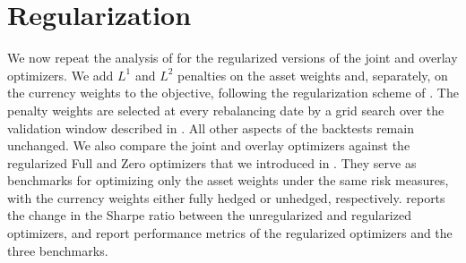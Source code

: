 \section{Regularization} \label{sec:effects-of-regularization}

We now repeat the analysis of  for the regularized versions of the joint and
overlay optimizers. We add $L^1$ and $L^2$ penalties on the asset weights and, separately, on the currency
weights to the objective, following the regularization scheme of . The penalty
weights are selected at every rebalancing date by a grid search over the validation window described in
. All other aspects of the backtests remain unchanged. We also compare the joint and overlay
optimizers against the regularized Full and Zero optimizers that we introduced in . They serve as 
benchmarks for optimizing only the asset weights under the same risk measures, with the currency weights either fully hedged or unhedged, respectively.
 reports the change in the Sharpe ratio between the unregularized and regularized optimizers,
and  report 
performance metrics of the regularized optimizers and the three benchmarks.

